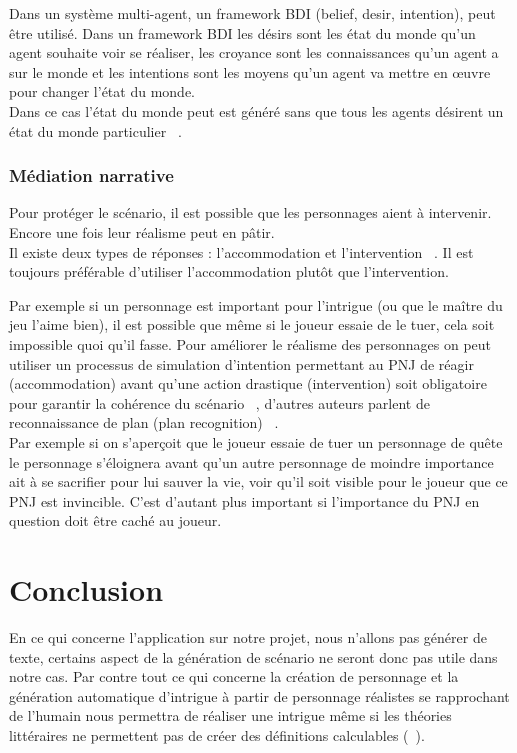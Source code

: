 \documentclass[asi]{picINSA}
\begin{document}
Dans un système multi-agent, un framework BDI (belief, desir, intention), peut être utilisé. Dans un framework BDI les désirs sont les état du monde qu'un agent souhaite voir se réaliser, les croyance sont les connaissances qu'un agent a sur le monde et les intentions sont les moyens qu'un agent va mettre en œuvre pour changer l'état du monde. \\

Dans ce cas l'état du monde peut est généré sans que tous les agents désirent un état du monde particulier ~\cite{riedl2004intent}.

\subsection{Médiation narrative}

Pour protéger le scénario, il est possible que les personnages aient à intervenir. Encore une fois leur réalisme peut en pâtir. \\

Il existe deux types de réponses : l’accommodation et l'intervention ~\cite{riedl2003managing}.
Il est toujours préférable d'utiliser l’accommodation plutôt que l'intervention.

Par exemple si un personnage est important pour l'intrigue (ou que le maître du jeu l'aime bien),
il est possible que même si le joueur essaie de le tuer, cela soit impossible quoi qu'il fasse.
Pour améliorer le réalisme des personnages on peut utiliser un processus de simulation d'intention
permettant au PNJ de réagir (accommodation)
avant qu'une action drastique (intervention) soit obligatoire pour garantir la cohérence du
scénario ~\cite{Ciarlini:2010:ERP:1658866.1658874}, d'autres auteurs parlent de reconnaissance de plan (plan recognition) ~\cite{riedl2003managing}. \\

Par exemple si on s'aperçoit que le joueur essaie de tuer un personnage de quête le personnage s'éloignera avant qu'un autre
personnage de moindre importance ait à se sacrifier pour lui sauver la vie, voir qu'il soit visible pour le joueur que ce PNJ est invincible. C'est d'autant plus important si l'importance du PNJ en question doit être caché au joueur. \\

\chapter*{Conclusion}

En ce qui concerne l'application sur notre projet, nous n'allons pas générer de texte, certains aspect de la génération de
scénario ne seront donc pas utile dans notre cas. Par contre tout ce qui concerne la création de personnage et la
 génération automatique d'intrigue à partir de personnage réalistes se rapprochant de l'humain nous permettra de
  réaliser une intrigue même si les théories littéraires ne permettent pas de créer des définitions calculables (~\cite{Callaway2002213}). \\
\end{document}
